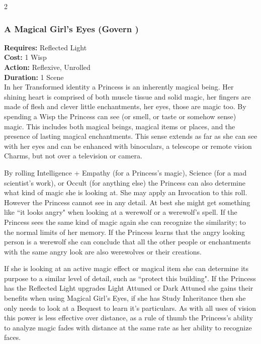 \begin{multicols}{2}
\subsubsection*{A Magical Girl's Eyes (Govern \textbullet\textbullet\textbullet)}

\noindent \textbf{Requires:} Reflected Light\\

\noindent \textbf{Cost:} 1 Wisp\\

\noindent \textbf{Action:} Reflexive, Unrolled\\

\noindent \textbf{Duration:} 1 Scene\\

\noindent In her Transformed identity a Princess is an inherently magical being. Her shining heart is comprised of both muscle tissue and solid magic, her fingers are made of flesh and clever little enchantments, her eyes, those are magic too. By spending a Wisp the Princess can see (or smell, or taste or somehow sense) magic. This includes both magical beings, magical items or places, and the presence of lasting magical enchantments. This sense extends as far as she can see with her eyes and can be enhanced with binoculars, a telescope or remote vision Charms, but not over a television or camera.

By rolling Intelligence + Empathy (for a Princess's magic), Science (for a mad scientist's work), or Occult (for anything else) the Princess can also determine what kind of magic she is looking at. She may apply an Invocation to this roll. However the Princess cannot see in any detail. At best she might get something like \textquotedblleft it looks angry" when looking at a werewolf or a werewolf's spell. If the Princess sees the same kind of magic again she can recognize the similarity; to the normal limits of her memory. If the Princess learns that the angry looking person is a werewolf she can conclude that all the other people or enchantments with the same angry look are also werewolves or their creations.

If she is looking at an active magic effect or magical item she can determine its purpose to a similar level of detail, such as \textquotedblleft protect this building". If the Princess has the Reflected Light upgrades Light Attuned or Dark Attuned she gains their benefits when using Magical Girl's Eyes, if she has Study Inheritance then she only needs to look at a Bequest to learn it's particulars. As with all uses of vision this power is less effective over distance, as a rule of thumb the Princess's ability to analyze magic fades with distance at the same rate as her ability to recognize faces.


\end{multicols}
